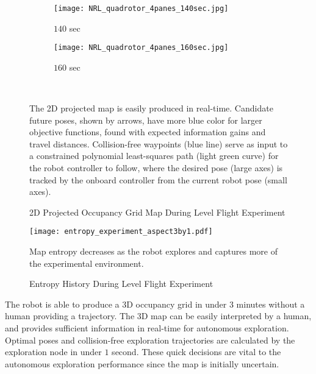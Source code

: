 \begin{figure}[!t]
{	\hspace*{0.02\columnwidth}
    	\begin{subfigure}[t]{0.3\columnwidth}
           	\centering
          	\texttt{[image: NRL\_quadrotor\_4panes\_140sec.jpg]}
        		\caption{$140$ sec}
    	\end{subfigure}
	\hspace*{0.02\columnwidth}
    	\begin{subfigure}[t]{0.3\columnwidth}
           	\centering
          	\texttt{[image: NRL\_quadrotor\_4panes\_160sec.jpg]}
        		\caption{$160$ sec}
    	\end{subfigure}
}
\\
	\caption{2D Projected Occupancy Grid Map During Level Flight Experiment}
	\medskip
	\small
	The 2D projected map is easily produced in real-time. Candidate future poses, shown by arrows, have more blue color for larger objective functions, found with expected information gains and travel distances. Collision-free waypoints (blue line) serve as input to a constrained polynomial least-squares path (light green curve) for the robot controller to follow, where the desired pose (large axes) is tracked by the onboard controller from the current robot pose (small axes).
	\label{fig:exp2DMap}
\end{figure}

\begin{figure}[!t]
	\centering
	\texttt{[image: entropy\_experiment\_aspect3by1.pdf]}
	\caption{Entropy History During Level Flight Experiment}
	\medskip
	\small
	Map entropy decreases as the robot explores and captures more of the experimental environment.
	\label{fig:expH}
\end{figure}

The robot is able to produce a 3D occupancy grid in under $3$ minutes without a human providing a trajectory. The 3D map can be easily interpreted by a human, and provides sufficient information in real-time for autonomous exploration. Optimal poses and collision-free exploration trajectories are calculated by the exploration node in under $1$ second. These quick decisions are vital to the autonomous exploration performance since the map is initially uncertain.

